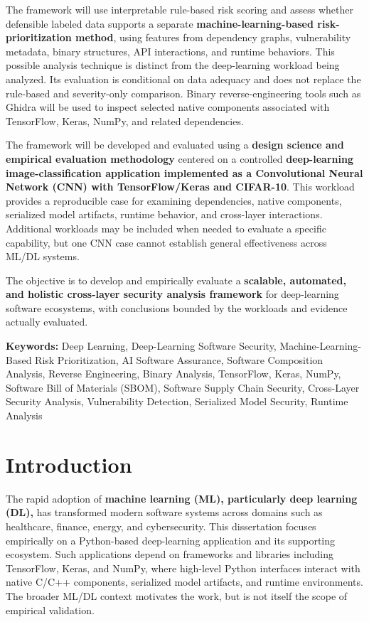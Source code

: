 \documentclass[
  12pt,
  letterpaper,
  oneside]{report}
\begin{document}
The framework will use interpretable rule-based risk scoring and assess
whether defensible labeled data supports a separate
\textbf{machine-learning-based risk-prioritization method}, using
features from dependency graphs, vulnerability metadata, binary
structures, API interactions, and runtime behaviors. This possible
analysis technique is distinct from the deep-learning workload being
analyzed. Its evaluation is conditional on data adequacy and does not
replace the rule-based and severity-only comparison. Binary
reverse-engineering tools such as Ghidra will be used to inspect
selected native components associated with TensorFlow, Keras, NumPy, and
related dependencies.

The framework will be developed and evaluated using a \textbf{design
science and empirical evaluation methodology} centered on a controlled
\textbf{deep-learning image-classification application implemented as a
Convolutional Neural Network (CNN) with TensorFlow/Keras and CIFAR-10}.
This workload provides a reproducible case for examining dependencies,
native components, serialized model artifacts, runtime behavior, and
cross-layer interactions. Additional workloads may be included when
needed to evaluate a specific capability, but one CNN case cannot
establish general effectiveness across ML/DL systems.

The objective is to develop and empirically evaluate a \textbf{scalable,
automated, and holistic cross-layer security analysis framework} for
deep-learning software ecosystems, with conclusions bounded by the
workloads and evidence actually evaluated.

\textbf{Keywords:} Deep Learning, Deep-Learning Software Security,
Machine-Learning-Based Risk Prioritization, AI Software Assurance,
Software Composition Analysis, Reverse Engineering, Binary Analysis,
TensorFlow, Keras, NumPy, Software Bill of Materials (SBOM), Software
Supply Chain Security, Cross-Layer Security Analysis, Vulnerability
Detection, Serialized Model Security, Runtime Analysis

\clearpage
\tableofcontents
\clearpage
{}
{}
\listoffigures
\clearpage
{}

\chapter{Introduction}\label{1-introduction}

The rapid adoption of \textbf{machine learning (ML), particularly deep
learning (DL),} has transformed modern software systems across domains
such as healthcare, finance, energy, and cybersecurity. This
dissertation focuses empirically on a Python-based deep-learning
application and its supporting ecosystem. Such applications depend on
frameworks and libraries including TensorFlow, Keras, and NumPy, where
high-level Python interfaces interact with native C/C++ components,
serialized model artifacts, and runtime environments. The broader ML/DL
context motivates the work, but is not itself the scope of empirical
validation.
\end{document}
